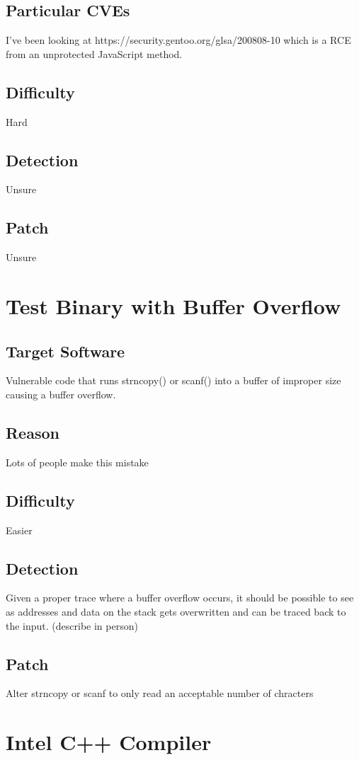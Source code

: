 \subsection{Particular CVEs}
I've been looking at https://security.gentoo.org/glsa/200808-10 which is a RCE from an unprotected JavaScript method.
\subsection{Difficulty}
Hard
\subsection{Detection}
Unsure
\subsection{Patch}
Unsure 




\section{Test Binary with Buffer Overflow}
\subsection{Target Software}
Vulnerable code that runs strncopy() or scanf() into a buffer of improper size causing a buffer overflow.
\subsection{Reason}
Lots of people make this mistake
\subsection{Difficulty}
Easier
\subsection{Detection}
Given a proper trace where a buffer overflow occurs, it should be possible to see as addresses and data on the stack gets overwritten and can be traced back to the input.  (describe in person)
\subsection{Patch}
Alter strncopy or scanf to only read an acceptable number of chracters

\section{Intel C++ Compiler}
